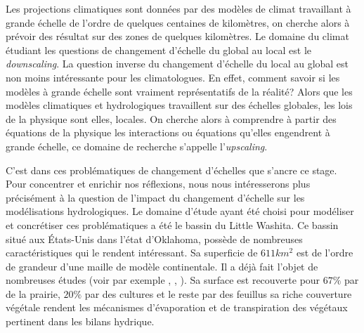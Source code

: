 \documentclass[a4paper,11pt]{article}
\begin{document}
Les projections climatiques sont données par des modèles de climat travaillant à grande échelle de l'ordre de quelques centaines de kilomètres, on cherche alors à prévoir des résultat sur des zones de quelques kilomètres. Le domaine du climat étudiant les questions de changement d'échelle du global au local est le \textit{downscaling}. La question inverse du changement d'échelle du local au global est non moins intéressante pour les climatologues. En effet, comment savoir si les modèles à grande échelle sont vraiment représentatifs de la réalité? Alors que les modèles climatiques et hydrologiques travaillent sur des échelles globales, les lois de la physique sont elles, locales. On cherche alors à comprendre à partir des équations de la physique les interactions ou équations qu'elles engendrent à grande échelle, ce domaine de recherche s'appelle l'\textit{upscaling}.

C'est dans ces problématiques de changement d'échelles que s'ancre ce stage. Pour concentrer et enrichir nos réflexions, nous nous intéresserons plus précisément à la question de l'impact du changement d'échelle sur les modélisations hydrologiques. Le domaine d'étude ayant été choisi pour modéliser et concrétiser ces problématiques a été le bassin du Little Washita. Ce bassin situé aux États-Unis dans l’état d’Oklahoma, possède de nombreuses caractéristiques qui le rendent intéressant. Sa superficie de $611km^2$ est de l'ordre de grandeur d'une maille de modèle continentale. Il a déjà fait l'objet de nombreuses études (voir par exemple \cite{maxwell2007groundwater}, \cite{rosero2011ensemble}, \cite{maquin2016developpement}). Sa surface est recouverte pour $67\%$ par de la prairie, $20\%$ par des cultures et le reste par des feuillus sa riche couverture végétale rendent les mécanismes d'évaporation et de transpiration des végétaux pertinent dans les bilans hydrique.





\newpage
 

\end{document}
